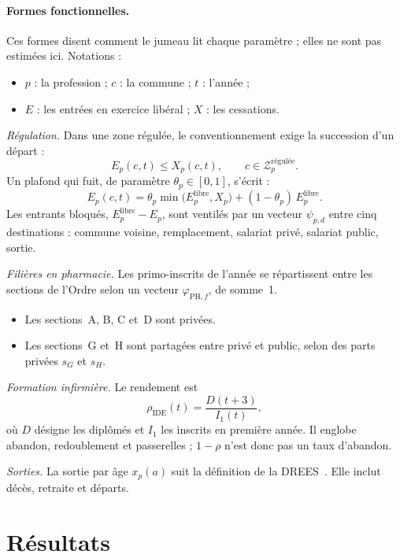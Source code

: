 \paragraph{Formes fonctionnelles.}
Ces formes disent comment le jumeau lit chaque paramètre ; elles ne sont pas
estimées ici. Notations :
\begin{itemize}
\item $p$ : la profession ; $c$ : la commune ; $t$ : l'année ;
\item $E$ : les entrées en exercice libéral ; $X$ : les cessations.
\end{itemize}

\emph{Régulation.} Dans une zone régulée, le conventionnement exige la
succession d'un départ :
\begin{equation}
E_p(c,t) \le X_p(c,t), \qquad c \in \mathcal{Z}_p^{\text{régulée}}.
\end{equation}
Un plafond qui fuit, de paramètre $\theta_p \in [0,1]$, s'écrit :
\begin{equation}
E_p(c,t) = \theta_p \min\bigl(E^{\text{libre}}_p, X_p\bigr) + (1-\theta_p)\,E^{\text{libre}}_p .
\end{equation}
Les entrants bloqués, $E^{\text{libre}}_p - E_p$, sont ventilés par un
vecteur $\psi_{p,d}$ entre cinq destinations : commune voisine,
remplacement, salariat privé, salariat public, sortie.

\emph{Filières en pharmacie.} Les primo-inscrits de l'année se répartissent
entre les sections de l'Ordre selon un vecteur $\varphi_{\mathrm{PH},f}$,
de somme~1.
\begin{itemize}
\item Les sections~A, B, C et~D sont privées.
\item Les sections~G et~H sont partagées entre privé et public, selon des
  parts privées $s_G$ et $s_H$.
\end{itemize}

\emph{Formation infirmière.} Le rendement est
\begin{equation}
\rho_{\mathrm{IDE}}(t) = \frac{D(t+3)}{I_1(t)},
\end{equation}
où $D$ désigne les diplômés et $I_1$ les inscrits en première année. Il
englobe abandon, redoublement et passerelles ; $1-\rho$ n'est donc pas un
taux d'abandon.

\emph{Sorties.} La sortie par âge $x_p(a)$ suit la définition de la
DREES~\cite{a1-dd76}. Elle inclut décès, retraite et départs.

\section{Résultats}

